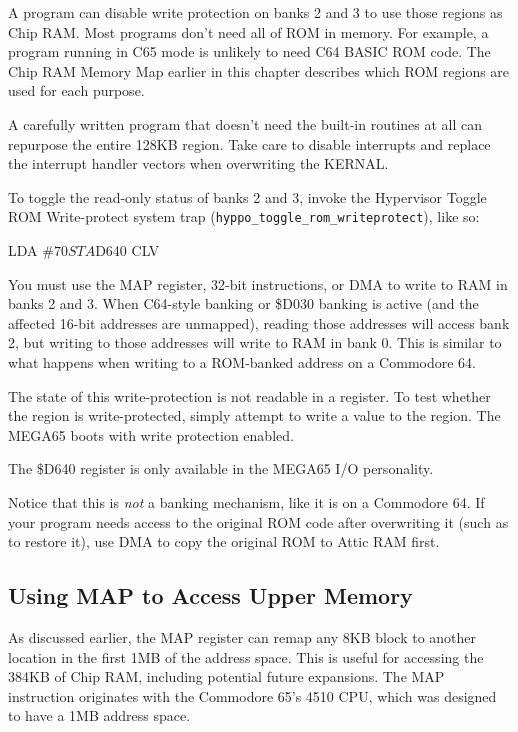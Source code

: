 A program can disable write protection on banks 2 and 3 to use those regions
as Chip RAM. Most programs don't need all of ROM in memory. For example, a
program running in C65 mode is unlikely to need C64 BASIC ROM code. The Chip
RAM Memory Map earlier in this chapter describes which ROM regions are used
for each purpose.

A carefully written program that doesn't need the built-in routines at all can
repurpose the entire 128KB region. Take care to disable interrupts and replace
the interrupt handler vectors when overwriting the KERNAL.

To toggle the read-only status of banks 2 and 3, invoke the Hypervisor Toggle
ROM Write-protect system trap ({\tt hyppo\_toggle\_rom\_writeprotect}), like so:

\begin{asmcode}
LDA #$70
STA $D640
CLV
\end{asmcode}

You must use the MAP register, 32-bit instructions, or DMA to write to RAM in
banks 2 and 3. When C64-style banking or \$D030 banking is active (and the
affected 16-bit addresses are unmapped), reading those addresses will access
bank 2, but writing to those addresses will write to RAM in bank 0. This is
similar to what happens when writing to a ROM-banked address on a Commodore
64.

The state of this write-protection is not readable in a register. To test
whether the region is write-protected, simply attempt to write a value to the
region. The MEGA65 boots with write protection enabled.

The \$D640 register is only available in the MEGA65 I/O personality.

Notice that this is {\em not} a banking mechanism, like it is on a Commodore
64. If your program needs access to the original ROM code after overwriting it
(such as to restore it), use DMA to copy the original ROM to Attic RAM first.

\subsection{Using MAP to Access Upper Memory}

As discussed earlier, the MAP register can remap any 8KB block to another
location in the first 1MB of the address space. This is useful for
accessing the 384KB of Chip RAM, including potential future expansions. The MAP
instruction originates with the Commodore 65's 4510 CPU, which was designed to
have a 1MB address space.


